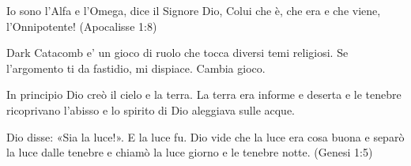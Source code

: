 \documentclass[12pt,a4paper,twoside,openany]{book}
\begin{document}

\pagebreak

\begin{center}
{\LARGE Io sono l'Alfa e l'Omega, dice il Signore Dio, Colui che è, che era e che viene, l'Onnipotente!} {\normalsize (Apocalisse 1:8)}		
\end{center}
 

\vfill

Dark Catacomb e' un gioco di ruolo che tocca diversi temi religiosi. Se l'argomento ti da fastidio, mi dispiace. Cambia gioco.

\pagebreak

\setcounter{page}{1}

\begin{multicols}{2}
{\small \tableofcontents{}}

\end{multicols}

\vfill

\begin{changemargin}{0.3cm}{0.3cm}\begin{tcolorbox}
In principio Dio creò il cielo e la terra. La terra era informe e deserta e le tenebre ricoprivano l'abisso e lo spirito di Dio aleggiava sulle acque.

Dio disse: «Sia la luce!». E la luce fu. Dio vide che la luce era cosa buona e separò la luce dalle tenebre e chiamò la luce giorno e le tenebre notte. (Genesi 1:5)
\end{tcolorbox}\end{changemargin}

\pagebreak





\end{document}
